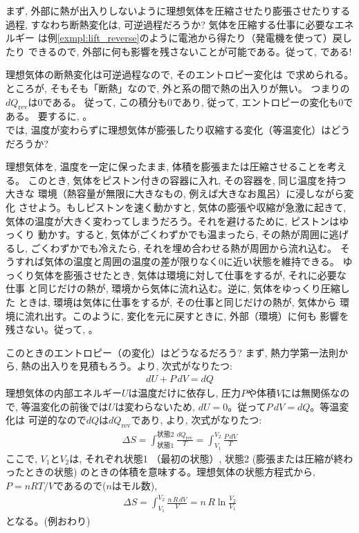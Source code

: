 まず, 外部に熱が出入りしないように理想気体を圧縮させたり膨張させたりする過程, 
すなわち断熱変化は, 可逆過程だろうか? 気体を圧縮する仕事に必要なエネルギー
は例\ref{exmpl:lift_reverse}のように電池から得たり（発電機を使って）戻したり
できるので, 外部に何も影響を残さないことが可能である。従って, である!

理想気体の断熱変化は可逆過程なので, そのエントロピー変化は
で求められる。ところが, そもそも「断熱」なので, 外と系の間で熱の出入りが無い。
つまりの$dQ_{\text{rev}}$は0である。
従って, この積分も0であり, 従って, エントロピーの変化も0である。
要するに, 。\\

では, 温度が変わらずに理想気体が膨張したり収縮する変化（等温変化）はどうだろうか?

\begin{exmpl}\label{exmpl:gas_expand_rev} 
理想気体を, 温度を一定に保ったまま, 体積を膨張または圧縮させることを考える。
このとき, 気体をピストン付きの容器に入れ, その容器を, 同じ温度を持つ大きな
環境（熱容量が無限に大きなもの, 例えば大きなお風呂）に浸しながら変化
させよう。もしピストンを速く動かすと, 気体の膨張や収縮が急激に起きて, 
気体の温度が大きく変わってしまうだろう。それを避けるために, ピストンはゆっくり
動かす。すると, 気体がごくわずかでも温まったら, その熱が周囲に逃げるし, 
ごくわずかでも冷えたら, それを埋め合わせる熱が周囲から流れ込む。
そうすれば気体の温度と周囲の温度の差が限りなく0に近い状態を維持できる。
ゆっくり気体を膨張させたとき, 気体は環境に対して仕事をするが, それに必要な仕事
と同じだけの熱が, 環境から気体に流れ込む。逆に, 気体をゆっくり圧縮した
ときは, 環境は気体に仕事をするが, その仕事と同じだけの熱が, 気体から
環境に流れ出す。このように, 変化を元に戻すときに, 外部（環境）に何も
影響を残さない。従って, 。

このときのエントロピー（の変化）はどうなるだろう? 
まず, 熱力学第一法則から, 熱の出入りを見積もろう。より, 次式がなりたつ:
\begin{eqnarray}
dU+P\,dV=dQ
\end{eqnarray}
理想気体の内部エネルギー$U$は温度だけに依存し, 圧力$P$や体積$V$には無関係なので, 
等温変化の前後では$U$は変わらないため, $dU=0$。従って$P\,dV=dQ$。等温変化は
可逆的なので$dQ$は$dQ_{\text{rev}}$であり, より, 次式がなりたつ:
\begin{eqnarray}
\Delta S=\int_{\text{状態1}}^{\text{状態2}} \frac{dQ_{\text{rev}}}{T}=\int_{V_1}^{V_2}\frac{P\,dV}{T}
\end{eqnarray}
ここで, $V_1$と$V_2$は, それぞれ状態1 （最初の状態）, 状態2 (膨張または圧縮が終わったときの状態)
のときの体積を意味する。理想気体の状態方程式から, $P=nRT/V$であるので($n$はモル数), 
\begin{eqnarray}
\Delta S=\int_{V_1}^{V_2} \frac{n\,R\,dV}{V}=n\,R\ln\frac{V_2}{V_1}\label{eq:entropy_isothermal}
\end{eqnarray}
となる。(例おわり)\end{exmpl}

